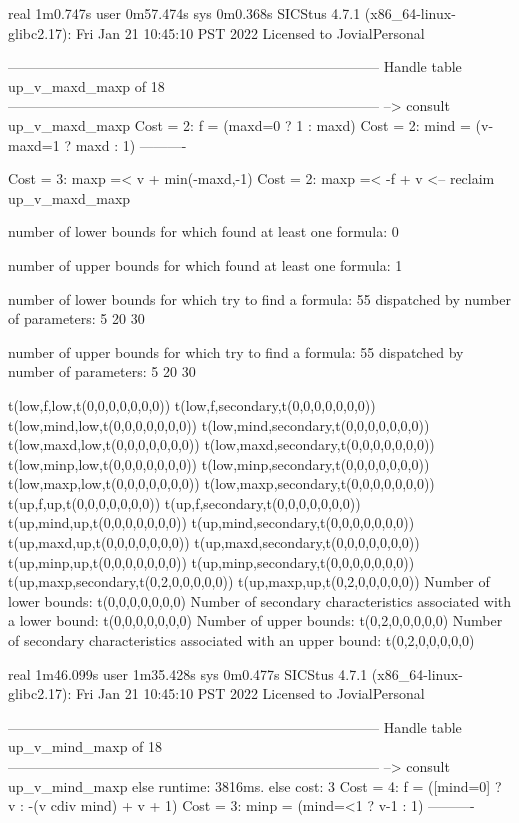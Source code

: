 real	1m0.747s
user	0m57.474s
sys	0m0.368s
SICStus 4.7.1 (x86_64-linux-glibc2.17): Fri Jan 21 10:45:10 PST 2022
Licensed to JovialPersonal


--------------------------------------------------------------------------------
Handle table up_v_maxd_maxp of 18
--------------------------------------------------------------------------------
--> consult up_v_maxd_maxp
Cost =  2:  f    = (maxd=0 ? 1 : maxd)
Cost =  2:  mind = (v-maxd=1 ? maxd : 1)
----------

Cost =  3:  maxp =< v + min(-maxd,-1) %
Cost =  2:  maxp =< -f + v
<-- reclaim up_v_maxd_maxp

number of lower bounds for which found at least one formula: 0

number of upper bounds for which found at least one formula: 1

number of lower bounds for which try to find a formula: 55
dispatched by number of parameters: 5  20  30

number of upper bounds for which try to find a formula: 55
dispatched by number of parameters: 5  20  30

t(low,f,low,t(0,0,0,0,0,0,0))
t(low,f,secondary,t(0,0,0,0,0,0,0))
t(low,mind,low,t(0,0,0,0,0,0,0))
t(low,mind,secondary,t(0,0,0,0,0,0,0))
t(low,maxd,low,t(0,0,0,0,0,0,0))
t(low,maxd,secondary,t(0,0,0,0,0,0,0))
t(low,minp,low,t(0,0,0,0,0,0,0))
t(low,minp,secondary,t(0,0,0,0,0,0,0))
t(low,maxp,low,t(0,0,0,0,0,0,0))
t(low,maxp,secondary,t(0,0,0,0,0,0,0))
t(up,f,up,t(0,0,0,0,0,0,0))
t(up,f,secondary,t(0,0,0,0,0,0,0))
t(up,mind,up,t(0,0,0,0,0,0,0))
t(up,mind,secondary,t(0,0,0,0,0,0,0))
t(up,maxd,up,t(0,0,0,0,0,0,0))
t(up,maxd,secondary,t(0,0,0,0,0,0,0))
t(up,minp,up,t(0,0,0,0,0,0,0))
t(up,minp,secondary,t(0,0,0,0,0,0,0))
t(up,maxp,secondary,t(0,2,0,0,0,0,0))
t(up,maxp,up,t(0,2,0,0,0,0,0))
Number of lower bounds:                                             t(0,0,0,0,0,0,0)
Number of secondary characteristics associated with a lower bound:  t(0,0,0,0,0,0,0)
Number of upper bounds:                                             t(0,2,0,0,0,0,0)
Number of secondary characteristics associated with an upper bound: t(0,2,0,0,0,0,0)

real	1m46.099s
user	1m35.428s
sys	0m0.477s
SICStus 4.7.1 (x86_64-linux-glibc2.17): Fri Jan 21 10:45:10 PST 2022
Licensed to JovialPersonal


--------------------------------------------------------------------------------
Handle table up_v_mind_maxp of 18
--------------------------------------------------------------------------------
--> consult up_v_mind_maxp
else runtime: 3816ms. else cost: 3
Cost =  4:  f    = ([mind=0] ? v : -(v cdiv mind) + v + 1) %
Cost =  3:  minp = (mind=<1 ? v-1 : 1)
----------

